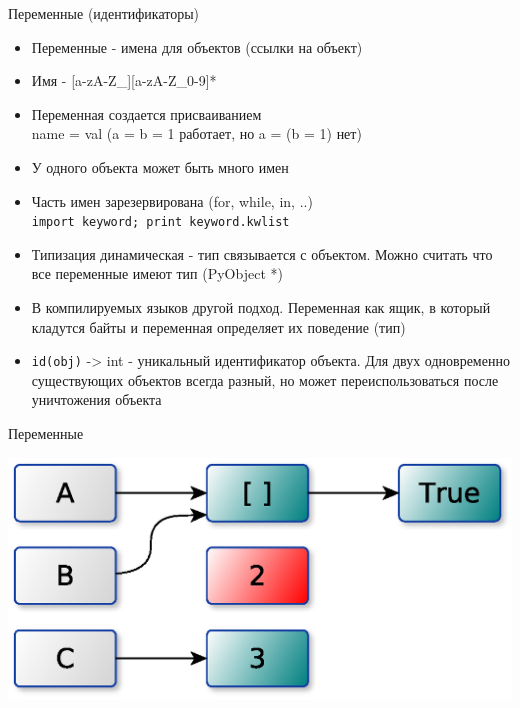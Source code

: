 \documentclass{article}
\begin{document}
\LARGE

\begin{center} Переменные (идентификаторы) \end{center}
\begin{itemize}
	\item Переменные - имена для объектов (ссылки на объект)
	\item Имя - [a-zA-Z\_][a-zA-Z\_0-9]*
	\item Переменная создается присваиванием \\ name = val (a = b = 1 работает, но a = (b = 1) нет)
	\item У одного объекта может быть много имен
	\item Часть имен зарезервирована (for, while, in, ..) \\
			\lstinline!import keyword; print keyword.kwlist!
	\item Типизация динамическая - тип связывается с объектом.
		  Можно считать что все переменные имеют тип (PyObject *)
	\item В компилируемых языков другой подход. Переменная как ящик, 
		  в который кладутся байты и переменная определяет их поведение (тип)
    \item \lstinline!id(obj)! -> int - уникальный идентификатор объекта. Для двух одновременно 
    существующих объектов всегда разный, но может переиспользоваться после уничтожения объекта
\end{itemize}
\newpage

\begin{center} Переменные \end{center}
\begin{center} \includegraphics{images/variables.eps} \end{center}
\newpage
\end{document}
